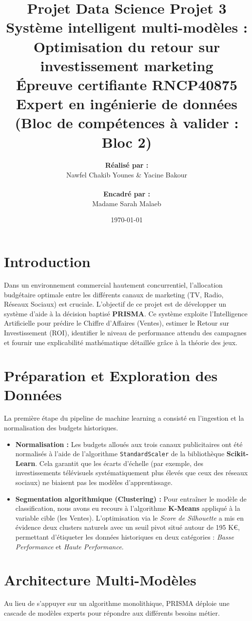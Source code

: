 \documentclass[a4paper,12pt]{article}
\title{
    \vspace{-2cm}
    \textbf{Projet Data Science Projet 3} \\
    \Large Système intelligent multi-modèles : Optimisation du retour sur investissement marketing \\
    \vspace{0.5cm}
    \large Épreuve certifiante RNCP40875 Expert en ingénierie de données (Bloc de compétences à valider : Bloc 2)
}
\author{
    \textbf{Réalisé par :} \\
    Nawfel Chakib Younes \quad \& \quad Yacine Bakour \\
    \vspace{0.5cm} \\
    \textbf{Encadré par :} \\
    Madame Sarah Malaeb
}
\date{\today}
\begin{document}
\maketitle
\newpage

\tableofcontents
\newpage

\section{Introduction}
Dans un environnement commercial hautement concurrentiel, l'allocation budgétaire optimale entre les différents canaux de marketing (TV, Radio, Réseaux Sociaux) est cruciale. L'objectif de ce projet est de développer un système d'aide à la décision baptisé \textbf{PRISMA}. Ce système exploite l'Intelligence Artificielle pour prédire le Chiffre d'Affaires (Ventes), estimer le Retour sur Investissement (ROI), identifier le niveau de performance attendu des campagnes et fournir une explicabilité mathématique détaillée grâce à la théorie des jeux.

\section{Préparation et Exploration des Données}
La première étape du pipeline de machine learning a consisté en l'ingestion et la normalisation des budgets historiques.
\begin{itemize}
    \item \textbf{Normalisation :} Les budgets alloués aux trois canaux publicitaires ont été normalisés à l'aide de l'algorithme \texttt{StandardScaler} de la bibliothèque \textbf{Scikit-Learn}. Cela garantit que les écarts d'échelle (par exemple, des investissements télévisuels systématiquement plus élevés que ceux des réseaux sociaux) ne biaisent pas les modèles d'apprentissage.
    \item \textbf{Segmentation algorithmique (Clustering) :} Pour entraîner le modèle de classification, nous avons eu recours à l'algorithme \textbf{K-Means} appliqué à la variable cible (les Ventes). L'optimisation via le \textit{Score de Silhouette} a mis en évidence deux clusters naturels avec un seuil pivot situé autour de 195 K€, permettant d'étiqueter les données historiques en deux catégories : \textit{Basse Performance} et \textit{Haute Performance}.
\end{itemize}

\section{Architecture Multi-Modèles}
Au lieu de s'appuyer sur un algorithme monolithique, PRISMA déploie une cascade de modèles experts pour répondre aux différents besoins métier.
\end{document}

